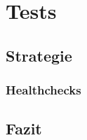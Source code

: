 
\section{Tests}
\label{Tests}

\subsection{Strategie}
\label{Tests:Strategie}


\subsubsection{Healthchecks}
\label{Tests:Healthchecks}


\subsection{Fazit}
\label{Tests:Fazit}

